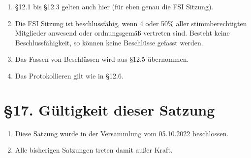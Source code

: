 \documentclass[a4paper,12pt]{article}
\begin{document}
\begin{enumerate}
    	\item
		§12.1 bis §12.3 gelten auch hier (für eben genau die FSI
		Sitzung).
    	\item
		Die FSI Sitzung ist beschlussfähig, wenn 4 oder 50\% aller
		stimmberechtigten Mitglieder anwesend oder ordnungsgemäß
		vertreten sind. Besteht keine Beschlussfähigkeit, so können
		keine Beschlüsse gefasst werden.
    	\item
		Das Fassen von Beschlüssen wird aus §12.5 übernommen.
    	\item
		Das Protokollieren gilt wie in §12.6.
\end{enumerate}

\section*{§17. Gültigkeit dieser Satzung}

\begin{enumerate}
	\item
		Diese Satzung wurde in der Versammlung vom 05.10.2022
		beschlossen.
	\item
		Alle bisherigen Satzungen treten damit außer Kraft.
\end{enumerate}
\end{document}
